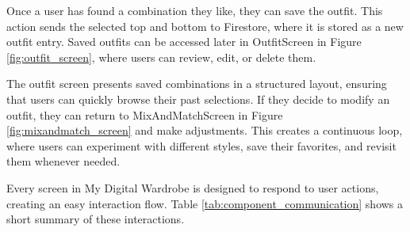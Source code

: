 Once a user has found a combination they like, they can save the outfit. This action sends the selected top and bottom to Firestore, where it is stored as a new outfit entry. Saved outfits can be accessed later in OutfitScreen in Figure \ref{fig:outfit_screen}, where users can review, edit, or delete them.

The outfit screen presents saved combinations in a structured layout, ensuring that users can quickly browse their past selections. If they decide to modify an outfit, they can return to MixAndMatchScreen in Figure \ref{fig:mixandmatch_screen} and make adjustments. This creates a continuous loop, where users can experiment with different styles, save their favorites, and revisit them whenever needed.


Every screen in My Digital Wardrobe is designed to respond to user actions, creating an easy interaction flow. Table \ref{tab:component_communication} shows a short summary of these interactions.


